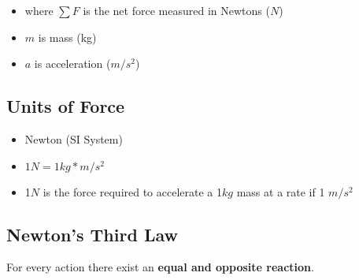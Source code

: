 \begin{itemize}
	\item where $\sum F$ is the net force measured in Newtons ($N$)
	\item $m$ is mass (kg)
	\item $a$ is acceleration ($m/s^2$)
\end{itemize}
	
\subsection{Units of Force}
\begin{itemize}
	\item Newton (SI System)
	\item $1N = 1kg*m/s^2$
	\item 1$N$ is the force required to accelerate a 1$kg$ mass at a rate if 1 $m/s^2$
\end{itemize}
	
\subsection{Newton's Third Law}
For every action there exist an \textbf{equal and opposite reaction}.